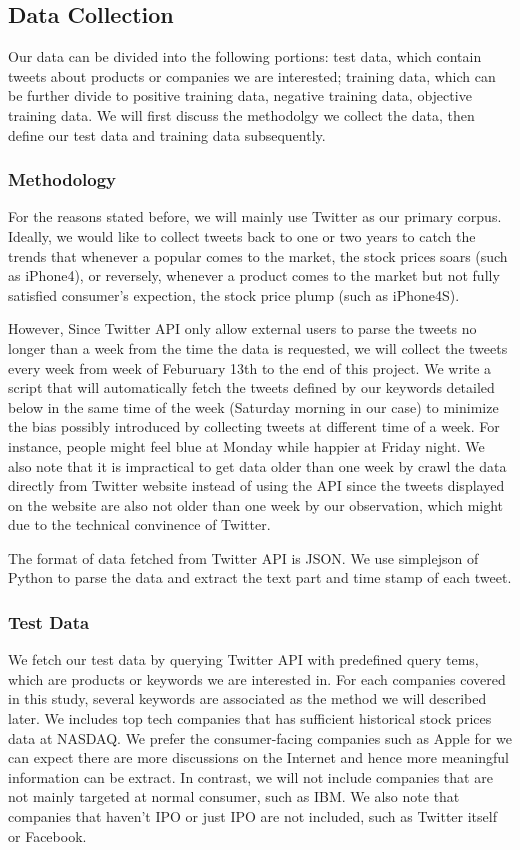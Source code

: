 \documentclass[12pt]{article}
\begin{document}
\subsection{Data Collection}\label{data-collection}
Our data can be divided into the following portions: test data, which contain tweets about products or companies we are interested; training data, which can be further divide to positive training data, negative training data, objective training data. We will first discuss the methodolgy we collect the data, then define our test data and training data subsequently.

\subsubsection{Methodology}
For the reasons stated before, we will mainly use Twitter as our primary corpus. Ideally, we would like to collect tweets back to one or two years to catch the trends that whenever a popular comes to the market, the stock prices soars (such as iPhone4), or reversely, whenever a product comes to the market but not fully satisfied consumer's expection, the stock price plump (such as iPhone4S). 

However, Since Twitter API only allow external users to parse the tweets no longer than a week from the time the data is requested, we will collect the tweets every week from week of Feburuary 13th to the end of this project. We write a script that will automatically fetch the tweets defined by our keywords detailed below in the same time of the week (Saturday morning in our case) to minimize the bias possibly introduced by collecting tweets at different time of a week. For instance, people might feel blue at Monday while happier at Friday night. We also note that it is impractical to get data older than one week by crawl the data directly from Twitter website instead of using the API since the tweets displayed on the website are also not older than one week by our observation, which might due to the technical convinence of Twitter.

The format of data fetched from Twitter API is JSON. We use simplejson of Python to parse the data and extract the text part and time stamp of each tweet.

\subsubsection{Test Data}
We fetch our test data by querying Twitter API with predefined query tems, which are products or keywords we are interested in. For each companies covered in this study, several keywords are associated as the method we will described later. We includes top tech companies that has sufficient historical stock prices data at NASDAQ. We prefer the consumer-facing companies such as Apple for we can expect there are more discussions on the Internet and hence more meaningful information can be extract. In contrast, we will not include companies that are not mainly targeted at normal consumer, such as IBM. We also note that companies that haven't IPO or just IPO are not included, such as Twitter itself or Facebook.
\end{document}
